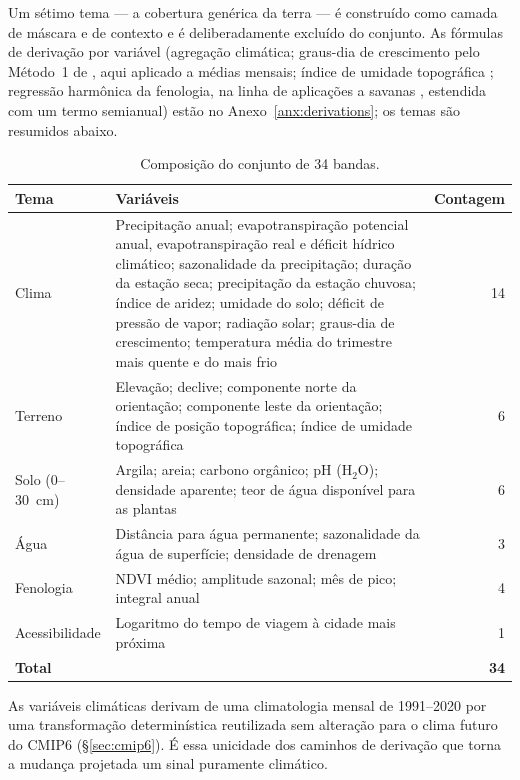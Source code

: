 Um sétimo tema --- a cobertura genérica da terra --- é construído como camada de máscara e de
contexto e é deliberadamente excluído do conjunto. As fórmulas de derivação por variável
(agregação climática; graus-dia de crescimento pelo Método~1 de \citet[p.~292]{mcmaster_growing_1997},
aqui aplicado a médias mensais; índice de umidade topográfica \citep[p.~48, eq.~8]{beven_physically_1979};
regressão harmônica da fenologia, na linha de aplicações a savanas \citep[p.~96]{levine_time_2019},
estendida com um termo semianual) estão no Anexo~\ref{anx:derivations}; os temas
são resumidos abaixo.

\begin{table}[H]
\centering
\caption{Composição do conjunto de 34 bandas.}\label{tab:stack}
\begin{tabular}{@{}lp{10cm}r@{}}
\toprule
Tema & Variáveis & Contagem \\
\midrule
Clima & Precipitação anual; evapotranspiração potencial anual, evapotranspiração real e déficit
  hídrico climático; sazonalidade da precipitação; duração da estação seca; precipitação da estação
  chuvosa; índice de aridez; umidade do solo; déficit de pressão de vapor; radiação solar; graus-dia
  de crescimento; temperatura média do trimestre mais quente e do mais frio & 14 \\
Terreno & Elevação; declive; componente norte da orientação; componente leste da orientação; índice
  de posição topográfica; índice de umidade topográfica & 6 \\
Solo (0--30~cm) & Argila; areia; carbono orgânico; pH (H$_2$O); densidade aparente; 
  teor de água disponível para as plantas & 6 \\
Água & Distância para água permanente; sazonalidade da água de superfície; densidade de drenagem & 3 \\
Fenologia & NDVI médio; amplitude sazonal; mês de pico; integral anual & 4 \\
Acessibilidade & Logaritmo do tempo de viagem à cidade mais próxima & 1 \\
\midrule
\textbf{Total} & & \textbf{34} \\
\bottomrule
\end{tabular}
\end{table}

As variáveis climáticas derivam de uma climatologia mensal de 1991--2020 por uma transformação
determinística reutilizada sem alteração para o clima futuro do CMIP6 (\S\ref{sec:cmip6}).
É essa unicidade dos caminhos de derivação que torna a mudança projetada um sinal puramente climático.

